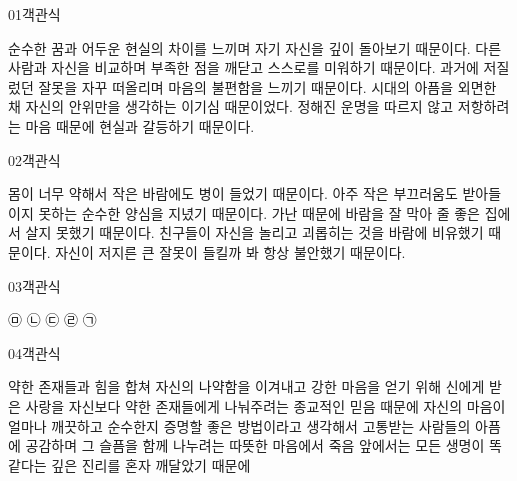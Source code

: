 \documentclass[fs9,seriesRus]{korfarm-base}
\begin{document}

\par\medskip
\kfBeginMC
\begin{kfQBlock}{01}{객관식}
\begin{kfChoices}
\kfChoice 순수한 꿈과 어두운 현실의 차이를 느끼며 자기 자신을 깊이 돌아보기 때문이다.
\kfChoice 다른 사람과 자신을 비교하며 부족한 점을 깨닫고 스스로를 미워하기 때문이다.
\kfChoice 과거에 저질렀던 잘못을 자꾸 떠올리며 마음의 불편함을 느끼기 때문이다.
\kfChoice 시대의 아픔을 외면한 채 자신의 안위만을 생각하는 이기심 때문이었다.
\kfChoice 정해진 운명을 따르지 않고 저항하려는 마음 때문에 현실과 갈등하기 때문이다.
\end{kfChoices}
\end{kfQBlock}
\begin{kfQBlock}{02}{객관식}
\begin{kfChoices}
\kfChoice 몸이 너무 약해서 작은 바람에도 병이 들었기 때문이다.
\kfChoice 아주 작은 부끄러움도 받아들이지 못하는 순수한 양심을 지녔기 때문이다.
\kfChoice 가난 때문에 바람을 잘 막아 줄 좋은 집에서 살지 못했기 때문이다.
\kfChoice 친구들이 자신을 놀리고 괴롭히는 것을 바람에 비유했기 때문이다.
\kfChoice 자신이 저지른 큰 잘못이 들킬까 봐 항상 불안했기 때문이다.
\end{kfChoices}
\end{kfQBlock}
\begin{kfQBlock}{03}{객관식}
\begin{kfChoices}
\kfChoice ㉤
\kfChoice ㉡
\kfChoice ㉢
\kfChoice ㉣
\kfChoice ㉠
\end{kfChoices}
\end{kfQBlock}
\begin{kfQBlock}{04}{객관식}
\begin{kfChoices}
\kfChoice 약한 존재들과 힘을 합쳐 자신의 나약함을 이겨내고 강한 마음을 얻기 위해
\kfChoice 신에게 받은 사랑을 자신보다 약한 존재들에게 나눠주려는 종교적인 믿음 때문에
\kfChoice 자신의 마음이 얼마나 깨끗하고 순수한지 증명할 좋은 방법이라고 생각해서
\kfChoice 고통받는 사람들의 아픔에 공감하며 그 슬픔을 함께 나누려는 따뜻한 마음에서
\kfChoice 죽음 앞에서는 모든 생명이 똑같다는 깊은 진리를 혼자 깨달았기 때문에
\end{kfChoices}
\end{kfQBlock}
\end{document}
